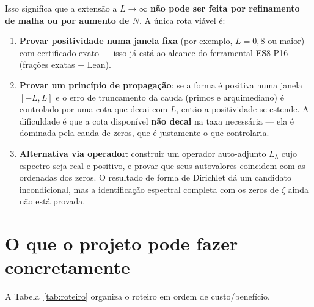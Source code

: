 \documentclass[11pt,a4paper]{article}
\theoremstyle{definition}
\theoremstyle{remark}
\newcommand{\RH}{\mathrm{RH}}
\begin{document}
Isso significa que a extensão a \(L\to\infty\) \textbf{não pode ser feita por
refinamento de malha ou por aumento de \(N\)}. A única rota viável é:

\begin{enumerate}
  \item \textbf{Provar positividade numa janela fixa} (por exemplo,
        \(L=0{,}8\) ou maior) com certificado exato --- isso já está ao alcance
        do ferramental ES8-P16 (frações exatas \(+\) Lean).
  \item \textbf{Provar um princípio de propagação}: se a forma é positiva numa
        janela \([-L,L]\) e o erro de truncamento da cauda (primos e
        arquimediano) é controlado por uma cota que decai com \(L\), então a
        positividade se estende. A dificuldade é que a cota disponível
        \textbf{não decai} na taxa necessária --- ela é dominada pela cauda
        de zeros, que é justamente o que \RH{} controlaria.
  \item \textbf{Alternativa via operador}: construir um operador auto-adjunto
        \(L_\lambda\) cujo espectro seja real e positivo, e provar que seus
        autovalores coincidem com as ordenadas dos zeros. O resultado de forma
        de Dirichlet dá um candidato incondicional, mas a identificação
        espectral completa com os zeros de \(\zeta\) ainda não está provada.
\end{enumerate}

\section{O que o projeto pode fazer concretamente}

A Tabela~\ref{tab:roteiro} organiza o roteiro em ordem de custo/benefício.
\end{document}
